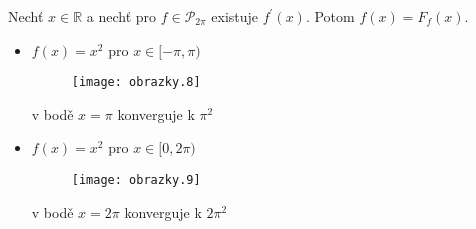 \begin{dusledek}
Nechť $x \in \mathbb{R}$ a nechť pro $f \in \mathcal{P}_{2 \pi}$ existuje $f^\prime (x)$. Potom $f(x)=F_f(x)$.
\end{dusledek}

\begin{priklad}
\begin{itemize}
\item $f(x) = x^2$ pro $x \in [-\pi, \pi)$
\begin{figure}[!h]
\begin{center}
\texttt{[image: obrazky.8]}
\end{center}
\end{figure}
v bodě $x = \pi$ konverguje k $\pi^2$

\item $f(x) = x^2$ pro $x \in [0,2 \pi)$
\begin{figure}[!h]
\begin{center}
\texttt{[image: obrazky.9]}
\end{center}
\end{figure}
v bodě $x = 2\pi$ konverguje k $2\pi^2$

\end{itemize}
\end{priklad}



